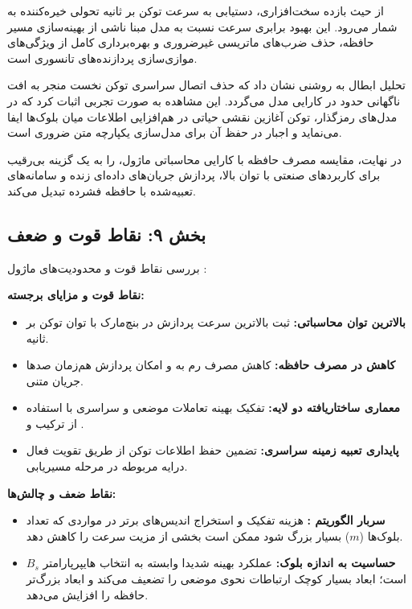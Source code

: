 از حیث بازده سخت‌افزاری، دستیابی به سرعت  توکن بر ثانیه تحولی خیره‌کننده به شمار می‌رود. این بهبود  برابری سرعت نسبت به مدل مبنا ناشی از بهینه‌سازی مسیر حافظه، حذف ضرب‌های ماتریسی غیرضروری و بهره‌برداری کامل از ویژگی‌های موازی‌سازی پردازنده‌های تانسوری است.

تحلیل ابطال به روشنی نشان داد که حذف اتصال سراسری توکن نخست منجر به افت ناگهانی حدود  در کارایی مدل می‌گردد. این مشاهده به صورت تجربی اثبات کرد که در مدل‌های رمزگذار، توکن آغازین نقشی حیاتی در هم‌افزایی اطلاعات میان بلوک‌ها ایفا می‌نماید و اجبار در حفظ آن برای مدل‌سازی یکپارچه متن ضروری است.

در نهایت، مقایسه مصرف حافظه  با کارایی محاسباتی ماژول،  را به یک گزینه بی‌رقیب برای کاربردهای صنعتی با توان بالا، پردازش جریان‌های داده‌ای زنده و سامانه‌های تعبیه‌شده با حافظه فشرده تبدیل می‌کند.

\subsection*{بخش ۹: نقاط قوت و ضعف }
بررسی نقاط قوت و محدودیت‌های ماژول :

\textbf{نقاط قوت و مزایای برجسته:}
\begin{itemize}
    \item \textbf{بالاترین توان محاسباتی:} ثبت بالاترین سرعت پردازش در بنچ‌مارک با توان  توکن بر ثانیه.
    \item \textbf{کاهش  در مصرف حافظه:} کاهش مصرف رم به  و امکان پردازش هم‌زمان صدها جریان متنی.
    \item \textbf{معماری ساختاریافته دو لایه:} تفکیک بهینه تعاملات موضعی و سراسری با استفاده از ترکیب  و .
    \item \textbf{پایداری تعبیه زمینه سراسری:} تضمین حفظ اطلاعات توکن  از طریق تقویت فعال درایه مربوطه در مرحله مسیریابی.
\end{itemize}

\textbf{نقاط ضعف و چالش‌ها:}
\begin{itemize}
    \item \textbf{سربار الگوریتم :} هزینه تفکیک و استخراج اندیس‌های برتر در مواردی که تعداد بلوک‌ها ($m$) بسیار بزرگ شود ممکن است بخشی از مزیت سرعت را کاهش دهد.
    \item \textbf{حساسیت به اندازه بلوک:} عملکرد بهینه شدیدا وابسته به انتخاب هایپرپارامتر $B_s$ است؛ ابعاد بسیار کوچک ارتباطات نحوی موضعی را تضعیف می‌کند و ابعاد بزرگ‌تر حافظه را افزایش می‌دهد.
\end{itemize}

